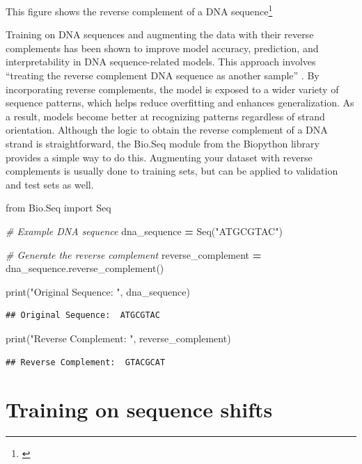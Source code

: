 \documentclass[
]{book}
\newenvironment{Shaded}{\begin{snugshade}}{\end{snugshade}}
\newcommand{\BuiltInTok}[1]{#1}
\newcommand{\CommentTok}[1]{\textcolor[rgb]{0.56,0.35,0.01}{\textit{#1}}}
\newcommand{\ImportTok}[1]{#1}
\newcommand{\NormalTok}[1]{#1}
\newcommand{\OperatorTok}[1]{\textcolor[rgb]{0.81,0.36,0.00}{\textbf{#1}}}
\newcommand{\StringTok}[1]{\textcolor[rgb]{0.31,0.60,0.02}{#1}}
\begin{document}
This figure shows the reverse complement of a DNA sequence\footnote{\citet{clark2021}}

Training on DNA sequences and augmenting the data with their reverse complements has been shown to improve model accuracy, prediction, and interpretability in DNA sequence-related models. This approach involves ``treating the reverse complement DNA sequence as another sample'' \citep{cao2019}. By incorporating reverse complements, the model is exposed to a wider variety of sequence patterns, which helps reduce overfitting and enhances generalization. As a result, models become better at recognizing patterns regardless of strand orientation. Although the logic to obtain the reverse complement of a DNA strand is straightforward, the Bio.Seq module from the Biopython library provides a simple way to do this. Augmenting your dataset with reverse complements is usually done to training sets, but can be applied to validation and test sets as well.

\begin{Shaded}
\begin{Highlighting}[]
\ImportTok{from}\NormalTok{ Bio.Seq }\ImportTok{import}\NormalTok{ Seq}

\CommentTok{\# Example DNA sequence}
\NormalTok{dna\_sequence }\OperatorTok{=}\NormalTok{ Seq(}\StringTok{"ATGCGTAC"}\NormalTok{)}

\CommentTok{\# Generate the reverse complement}
\NormalTok{reverse\_complement }\OperatorTok{=}\NormalTok{ dna\_sequence.reverse\_complement()}

\BuiltInTok{print}\NormalTok{(}\StringTok{"Original Sequence: "}\NormalTok{, dna\_sequence)}
\end{Highlighting}
\end{Shaded}

\begin{verbatim}
## Original Sequence:  ATGCGTAC
\end{verbatim}

\begin{Shaded}
\begin{Highlighting}[]
\BuiltInTok{print}\NormalTok{(}\StringTok{"Reverse Complement: "}\NormalTok{, reverse\_complement)}
\end{Highlighting}
\end{Shaded}

\begin{verbatim}
## Reverse Complement:  GTACGCAT
\end{verbatim}

\section{Training on sequence shifts}\label{training-on-sequence-shifts}
\end{document}

